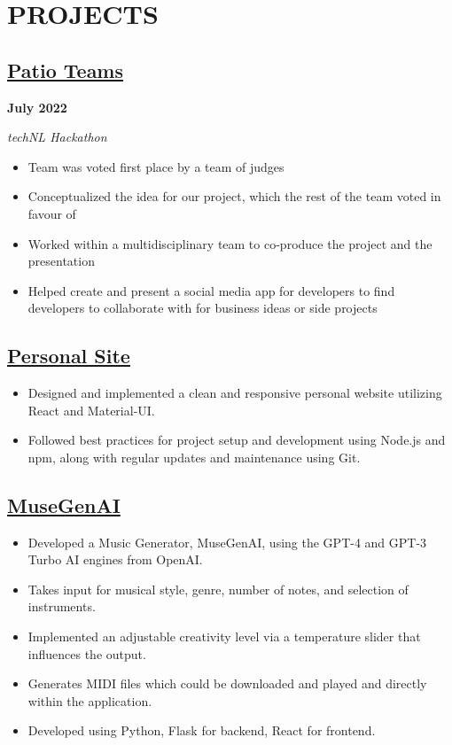 \documentclass[12pt]{extarticle}
\begin{document}
\section*{PROJECTS}
\subsection*{\href{https://technl.ca/2022/07/28/techfwd-conclusion/}{Patio Teams}
} \hfill \textbf{July 2022}

\textsl{techNL Hackathon}
\begin{itemize}
	\item Team was voted first place by a team of judges
  \item Conceptualized the idea for our project, which the rest of the team voted in favour of
  \item Worked within a multidisciplinary team to co-produce the project and the presentation
  \item Helped create and present a social media app for developers to find developers to collaborate with for business ideas or side projects
\end{itemize}

\subsection*{\href{https://github.com/Inefy/Me}{Personal Site}
} \hfill
\begin{itemize}
\item Designed and implemented a clean and responsive personal website utilizing React and Material-UI.
\item Followed best practices for project setup and development using Node.js and npm, along with regular updates and maintenance using Git.
\end{itemize}

\subsection*{\href{https://github.com/Inefy/MuseGenAI}{MuseGenAI}
} \hfill
\begin{itemize}
	\item Developed a Music Generator, MuseGenAI, using the GPT-4 and GPT-3 Turbo AI engines from OpenAI.
	\item Takes input for musical style, genre, number of notes, and selection of instruments.
	\item Implemented an adjustable creativity level via a temperature slider that influences the output.
	\item Generates MIDI files which could be downloaded and played and directly within the application.
	\item Developed using Python, Flask for backend, React for frontend.
\end{itemize}
\end{document}
